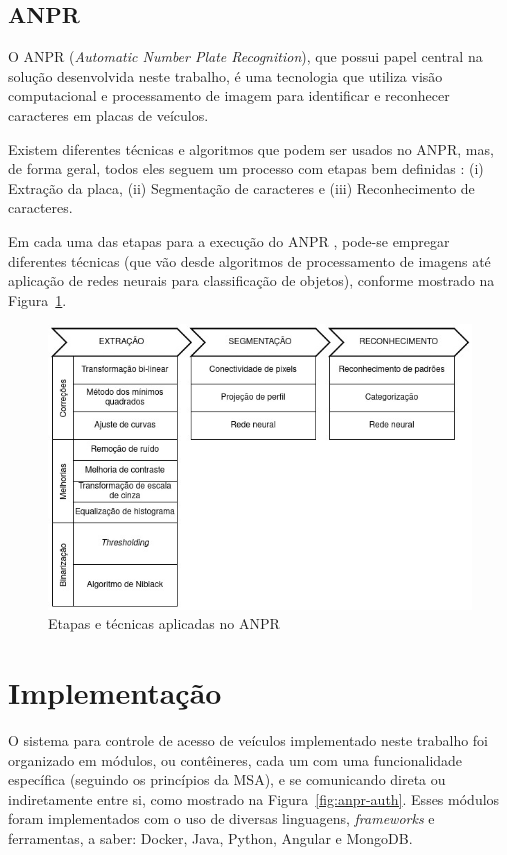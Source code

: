 \documentclass[12pt]{article}
\begin{document}
\subsection{ANPR}

O ANPR (\textit{Automatic Number Plate Recognition}), que possui papel central na solução desenvolvida neste trabalho, é uma tecnologia que utiliza visão computacional e processamento de imagem para identificar e reconhecer caracteres em placas de veículos.

Existem diferentes técnicas e algoritmos que podem ser usados no ANPR, mas, de forma geral, todos eles seguem um processo com etapas bem definidas \cite{mufti2021}: (i) Extração da placa, (ii) Segmentação de caracteres e (iii) Reconhecimento de caracteres.

Em cada uma das etapas para a execução do ANPR \cite{shashirangana2020}, pode-se empregar diferentes técnicas (que vão desde algoritmos de processamento de imagens até aplicação de redes neurais para classificação de objetos), conforme mostrado na Figura~\ref{fig:anpr-steps}.

\begin{figure}[ht]
	\centering
	\includegraphics[width=1\textwidth]{anpr-steps.jpg}
	\caption{Etapas e técnicas aplicadas no ANPR}
	\label{fig:anpr-steps}
\end{figure} 

\section{Implementação}

O sistema para controle de acesso de veículos implementado neste trabalho foi organizado em módulos, ou contêineres, cada um com uma funcionalidade específica (seguindo os princípios da MSA), e se comunicando direta ou indiretamente entre si, como mostrado na Figura~\ref{fig:anpr-auth}. Esses módulos foram implementados com o uso de diversas linguagens, \textit{frameworks} e ferramentas, a saber: Docker, Java, Python, Angular e MongoDB.
\end{document}
